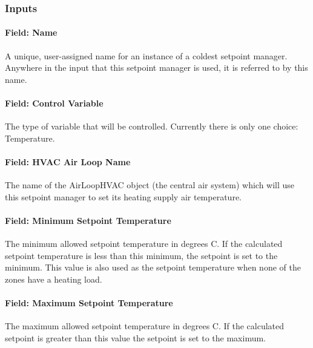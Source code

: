 \subsubsection{Inputs}\label{inputs-11-017}

\paragraph{Field: Name}\label{field-name-11-013}

A unique, user-assigned name for an instance of a coldest setpoint manager. Anywhere in the input that this setpoint manager is used, it is referred to by this name.

\paragraph{Field: Control Variable}\label{field-control-variable-11}

The type of variable that will be controlled. Currently there is only one choice: Temperature.

\paragraph{Field: HVAC Air Loop Name}\label{field-hvac-air-loop-name-1}

The name of the AirLoopHVAC object (the central air system) which will use this setpoint manager to set its heating supply air temperature.

\paragraph{Field: Minimum Setpoint Temperature}\label{field-minimum-setpoint-temperature-2}

The minimum allowed setpoint temperature in degrees C. If the calculated setpoint temperature is less than this minimum, the setpoint is set to the minimum. This value is also used as the setpoint temperature when none of the zones have a heating load.

\paragraph{Field: Maximum Setpoint Temperature}\label{field-maximum-setpoint-temperature-2}

The maximum allowed setpoint temperature in degrees C. If the calculated setpoint is greater than this value the setpoint is set to the maximum.

